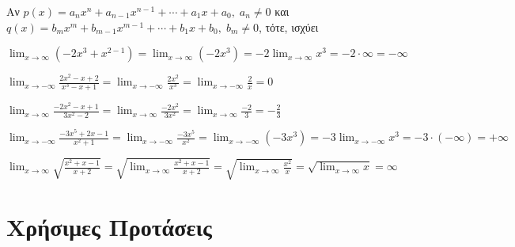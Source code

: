 \begin{prop}
  Αν $ p(x) = a_{n} x^{n} + a_{n-1}x^{n-1}+\cdots + a_{1}x + a_{0}, \; a_{n} \neq 0  $ 
  και $ q(x) = b_{m} x^{m} + b_{m-1}x^{m-1}+\cdots + b_{1}x + b_{0}, \; b_{m} \neq 0 $, 
  τότε, ισχύει 
  \begin{center}
  \end{center}
\end{prop}

\begin{example}
  $ \lim_{x \to \infty} (-2x^{3}+x^{2-1}) = \lim_{x \to \infty} (-2x^{3}) = -2
  \lim_{x \to \infty} x^{3} = -2 \cdot \infty = - \infty $
\end{example}
\begin{example}
  $ \lim_{x \to - \infty} \frac{2x^{2}-x+2}{x^{3}-x+1} = \lim_{x \to - \infty}
  \frac{2 x^{2}}{x^{3}} = \lim_{x \to - \infty} \frac{2}{x} = 0 $
\end{example}
\begin{example}
  $ \lim_{x \to \infty} \frac{-2x^{2}-x+1}{3x^{2}-2} = \lim_{x \to \infty}
  \frac{-2 x^{2}}{3 x^{2}} = \lim_{x \to \infty} \frac{-2}{3} = - 
  \frac{2}{3} $ 
\end{example}
\begin{example}
  $ \lim_{x \to - \infty} \frac{-3x^{5}+2x-1}{x^{2}+1} = \lim_{x \to - \infty}
  \frac{-3x^{5}}{x^{2}} = \lim_{x \to - \infty} (-3x^{3}) = -3 \lim_{x \to - \infty}
  x^{3} = -3 \cdot (- \infty) = + \infty $
\end{example}
\begin{example}
$ \lim_{x \to \infty} \sqrt{\frac{x^{2}+x-1}{x+2}} = \sqrt{\lim_{x \to \infty}
\frac{x^{2}+x-1}{x+2}} = \sqrt{\lim_{x \to \infty} \frac{x^{2}}{x}} = \sqrt{\lim_{x \to 
  \infty} x} = \infty $
  \end{example}


\newpage


\section*{Χρήσιμες Προτάσεις}

